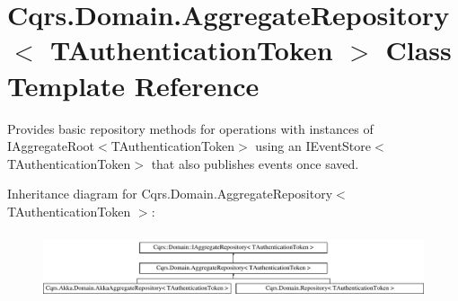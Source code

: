 \hypertarget{classCqrs_1_1Domain_1_1AggregateRepository}{}\section{Cqrs.\+Domain.\+Aggregate\+Repository$<$ T\+Authentication\+Token $>$ Class Template Reference}
\label{classCqrs_1_1Domain_1_1AggregateRepository}


Provides basic repository methods for operations with instances of I\+Aggregate\+Root$<$\+T\+Authentication\+Token$>$ using an I\+Event\+Store$<$\+T\+Authentication\+Token$>$ that also publishes events once saved.  


Inheritance diagram for Cqrs.\+Domain.\+Aggregate\+Repository$<$ T\+Authentication\+Token $>$\+:\begin{figure}[H]
\begin{center}
\leavevmode
\includegraphics[height=2.000000cm]{classCqrs_1_1Domain_1_1AggregateRepository}
\end{center}
\end{figure}
